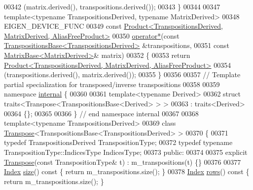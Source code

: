 \begin{DoxyCode}
00342             (matrix.derived(), transpositions.derived());
00343 \}
00344 
00347 \textcolor{keyword}{template}<\textcolor{keyword}{typename} TranspositionsDerived, \textcolor{keyword}{typename} MatrixDerived>
00348 EIGEN\_DEVICE\_FUNC
00349 \textcolor{keyword}{const} \hyperlink{group___core___module_class_eigen_1_1_product}{Product<TranspositionsDerived, MatrixDerived, AliasFreeProduct>}
00350 \hyperlink{namespace_eigen_a32970f7eb62fe31eeefee72d24a046d0}{operator*}(\textcolor{keyword}{const} \hyperlink{class_eigen_1_1_transpositions_base}{TranspositionsBase<TranspositionsDerived>}
       &transpositions,
00351           \textcolor{keyword}{const} \hyperlink{group___core___module_class_eigen_1_1_matrix_base}{MatrixBase<MatrixDerived>}& matrix)
00352 \{
00353   \textcolor{keywordflow}{return} \hyperlink{group___core___module_class_eigen_1_1_product}{Product<TranspositionsDerived, MatrixDerived, AliasFreeProduct>}
00354             (transpositions.derived(), matrix.derived());
00355 \}
00356 
00357 \textcolor{comment}{// Template partial specialization for transposed/inverse transpositions}
00358 
00359 \textcolor{keyword}{namespace }\hyperlink{namespaceinternal}{internal} \{
00360 
00361 \textcolor{keyword}{template}<\textcolor{keyword}{typename} Derived>
00362 \textcolor{keyword}{struct }traits<Transpose<TranspositionsBase<Derived> > >
00363  : traits<Derived>
00364 \{\};
00365 
00366 \} \textcolor{comment}{// end namespace internal}
00367 
00368 \textcolor{keyword}{template}<\textcolor{keyword}{typename} TranspositionsDerived>
00369 \textcolor{keyword}{class }\hyperlink{group___core___module_class_eigen_1_1_transpose}{Transpose}<TranspositionsBase<TranspositionsDerived> >
00370 \{
00371     \textcolor{keyword}{typedef} TranspositionsDerived TranspositionType;
00372     \textcolor{keyword}{typedef} \textcolor{keyword}{typename} TranspositionType::IndicesType IndicesType;
00373   \textcolor{keyword}{public}:
00374 
00375     \textcolor{keyword}{explicit} \hyperlink{group___core___module_class_eigen_1_1_transpose}{Transpose}(\textcolor{keyword}{const} TranspositionType& t) : m\_transpositions(t) \{\}
00376 
00377     \hyperlink{class_eigen_1_1_transpositions_base_a3f5f06118b419e8e6ccbe49ed5b4c91f}{Index} \hyperlink{class_eigen_1_1_transpositions_base_a6888d6261a9cc24ee8607496e610a5a3}{size}()\textcolor{keyword}{ const }\{ \textcolor{keywordflow}{return} m\_transpositions.size(); \}
00378     \hyperlink{class_eigen_1_1_transpositions_base_a3f5f06118b419e8e6ccbe49ed5b4c91f}{Index} \hyperlink{class_eigen_1_1_transpositions_base_a8c073f17542a8fc9ac581c17f6cdc8d3}{rows}()\textcolor{keyword}{ const }\{ \textcolor{keywordflow}{return} m\_transpositions.size(); \}

\end{DoxyCode}
